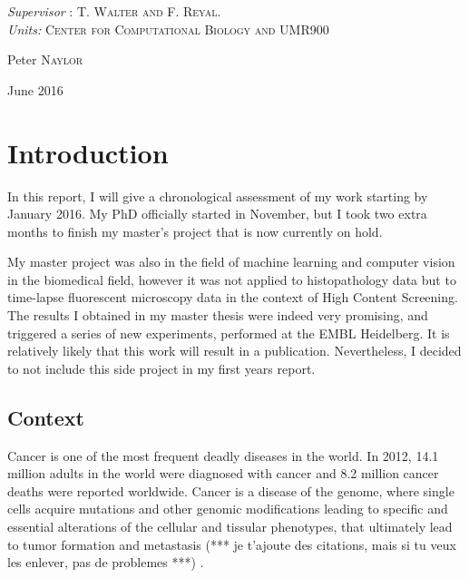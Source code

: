 \documentclass[a4paper,10pt]{article}
\begin{document}
\begin{titlepage}
   \begin{center}  \large
\textit{Supervisor} : \textsc{T. Walter and F. Reyal}. \\
\textit{Units:} \textsc{Center for Computational Biology and UMR900}

   \end{center}
     
  \begin{center} \Large
  Peter \textsc{Naylor}
  \end{center}


  \begin{center}  \large
    June 2016
  \end{center}

\end{titlepage}




\newpage
\tableofcontents
\newpage

\section{Introduction}

In this report, I will give a chronological assessment of my work starting by
 January 2016. My PhD officially started in November, but I took
 two extra months to finish my master's project that is now currently
 on hold. 

My master project was also in the field of machine
 learning and computer vision in the biomedical field, however it was not applied to
 histopathology data but to time-lapse fluorescent microscopy
 data in the context of High Content Screening. The results I 
 obtained in my master thesis were indeed very promising, and triggered
 a series of new experiments, performed at the EMBL Heidelberg. It is
 relatively likely that this work will result in a
 publication. Nevertheless, I decided to not include this side project
 in my first years report.


\subsection{Context}
Cancer is one of the most frequent deadly diseases in the world. In
2012, 14.1 million adults in the world were diagnosed with cancer and
8.2 million cancer deaths were reported worldwide. Cancer is a disease
of the genome, where single cells acquire mutations and other genomic
modifications leading to
specific and essential alterations of the cellular and tissular
phenotypes, that ultimately lead to tumor formation and metastasis
(*** je t'ajoute des citations, mais si tu veux les enlever, pas de
problemes ***) \citep{Hanahan2000,Hanahan2011}. 
\end{document}
